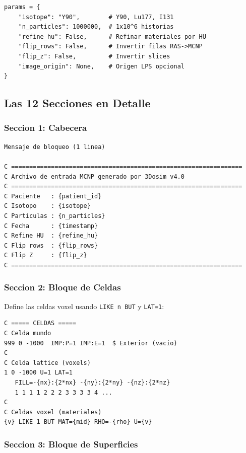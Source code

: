 \documentclass[12pt,a4paper]{article}
\begin{document}
\begin{verbatim}
params = {
    "isotope": "Y90",        # Y90, Lu177, I131
    "n_particles": 1000000,  # 1x10^6 historias
    "refine_hu": False,      # Refinar materiales por HU
    "flip_rows": False,      # Invertir filas RAS->MCNP
    "flip_z": False,         # Invertir slices
    "image_origin": None,    # Origen LPS opcional
}
\end{verbatim}

\subsection{Las 12 Secciones en Detalle}

\subsubsection{Seccion 1: Cabecera}

\begin{verbatim}
Mensaje de bloqueo (1 linea)

C ================================================================
C Archivo de entrada MCNP generado por 3Dosim v4.0
C ================================================================
C Paciente   : {patient_id}
C Isotopo    : {isotope}
C Particulas : {n_particles}
C Fecha      : {timestamp}
C Refine HU  : {refine_hu}
C Flip rows  : {flip_rows}
C Flip Z     : {flip_z}
C ================================================================
\end{verbatim}

\subsubsection{Seccion 2: Bloque de Celdas}

Define las celdas voxel usando \texttt{LIKE n BUT} y \texttt{LAT=1}:

\begin{verbatim}
C ===== CELDAS =====
C Celda mundo
999 0 -1000  IMP:P=1 IMP:E=1  $ Exterior (vacio)
C
C Celda lattice (voxels)
1 0 -1000 U=1 LAT=1
   FILL=-{nx}:{2*nx} -{ny}:{2*ny} -{nz}:{2*nz}
   1 1 1 1 2 2 2 3 3 3 3 4 ...
C
C Celdas voxel (materiales)
{v} LIKE 1 BUT MAT={mid} RHO=-{rho} U={v}
\end{verbatim}

\subsubsection{Seccion 3: Bloque de Superficies}
\end{document}
